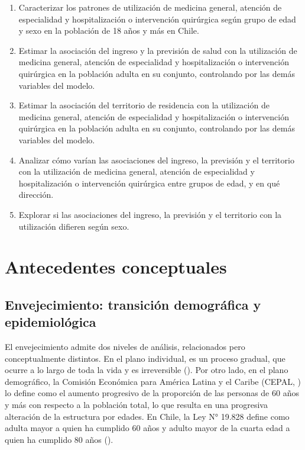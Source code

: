 \documentclass[
  spanish,
  a4paper,
  oneside]{scrbook}
\providecommand{\tightlist}{%
  \setlength{\itemsep}{0pt}\setlength{\parskip}{0pt}}
\begin{document}
\begin{enumerate}
\def\labelenumi{\arabic{enumi}.}
\tightlist
\item
  Caracterizar los patrones de utilización de medicina general, atención
  de especialidad y hospitalización o intervención quirúrgica según
  grupo de edad y sexo en la población de 18 años y más en Chile.
\item
  Estimar la asociación del ingreso y la previsión de salud con la
  utilización de medicina general, atención de especialidad y
  hospitalización o intervención quirúrgica en la población adulta en su
  conjunto, controlando por las demás variables del modelo.
\item
  Estimar la asociación del territorio de residencia con la utilización
  de medicina general, atención de especialidad y hospitalización o
  intervención quirúrgica en la población adulta en su conjunto,
  controlando por las demás variables del modelo.
\item
  Analizar cómo varían las asociaciones del ingreso, la previsión y el
  territorio con la utilización de medicina general, atención de
  especialidad y hospitalización o intervención quirúrgica entre grupos
  de edad, y en qué dirección.
\item
  Explorar si las asociaciones del ingreso, la previsión y el territorio
  con la utilización difieren según sexo.
\end{enumerate}


\chapter{Antecedentes conceptuales}\label{antecedentes-conceptuales}

\section{Envejecimiento: transición demográfica y
epidemiológica}\label{envejecimiento-transiciuxf3n-demogruxe1fica-y-epidemioluxf3gica}

El envejecimiento admite dos niveles de análisis, relacionados pero
conceptualmente distintos. En el plano individual, es un proceso
gradual, que ocurre a lo largo de toda la vida y es irreversible
(). Por otro
lado, en el plano demográfico, la Comisión Económica para América Latina
y el Caribe (CEPAL, ) lo define
como el aumento progresivo de la proporción de las personas de 60 años y
más con respecto a la población total, lo que resulta en una progresiva
alteración de la estructura por edades. En Chile, la Ley N° 19.828
define como adulta mayor a quien ha cumplido 60 años y adulto mayor de
la cuarta edad a quien ha cumplido 80 años ().
\end{document}
